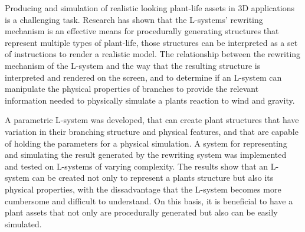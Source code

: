 
Producing and simulation of realistic looking plant-life assets in 3D applications is a challenging task. Research has shown that the L-systems' rewriting mechanism is an effective means for procedurally generating structures that represent multiple types of plant-life, those structures can be interpreted as a set of instructions to render a realistic model. The relationship between the rewriting mechanism of the L-system and the way that the resulting structure is interpreted and rendered on the screen, and to determine if an L-system can manipulate the physical properties of branches to provide the relevant information needed to physically simulate a plants reaction to wind and gravity. 

A parametric L-system was developed, that can create plant structures that have variation in their branching structure and physical features, and that are capable of holding the parameters for a physical simulation. A system for representing and simulating the result generated by the rewriting system was implemented and tested on L-systems of varying complexity. The results show that an L-system can be created not only to represent a plants structure but also its physical properties, with the dissadvantage that the L-system becomes more cumbersome and difficult to understand. On this basis, it is beneficial to have a plant assets that not only are procedurally generated but also can be easily simulated.